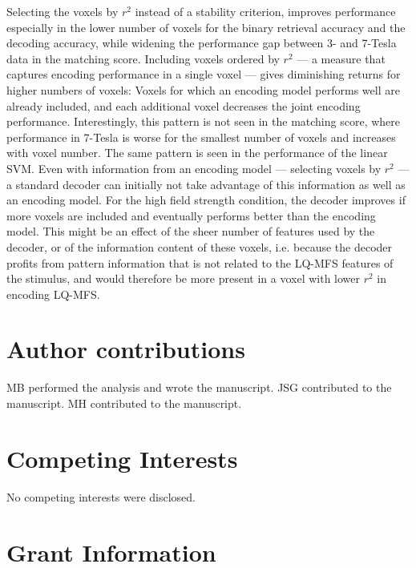 Selecting the voxels by $r^2$ instead of a stability criterion, improves
performance especially in the lower number of voxels for the binary retrieval
accuracy and the decoding accuracy, while widening the performance gap between
3- and 7-Tesla data in the matching score. Including voxels ordered by $r^2$
--- a measure that captures encoding performance in a single voxel --- gives
diminishing returns for higher numbers of voxels: Voxels for which an encoding
model performs well are already included, and each additional voxel decreases
the joint encoding performance.  Interestingly, this pattern is not seen in the
matching score, where performance in 7-Tesla is worse for the smallest number
of voxels and increases with voxel number. The same pattern is seen in the
performance of the linear SVM. Even with information from an encoding model ---
selecting voxels by $r^2$ --- a standard decoder can initially not take
advantage of this information as well as an encoding model. For the high field
strength condition, the decoder improves if more voxels are included and
eventually performs better than the encoding model. This might be an effect of
the sheer number of features used by the decoder, or of the information content
of these voxels, i.e. because the decoder profits from pattern information that
is not related to the LQ-MFS features of the stimulus, and would therefore be
more present in a voxel with lower $r^2$ in encoding LQ-MFS.


\section*{Author contributions}

MB performed the analysis and wrote the manuscript.
JSG contributed to the manuscript.
MH contributed to the manuscript.


\section*{Competing Interests}

No competing interests were disclosed.

\section*{Grant Information}

